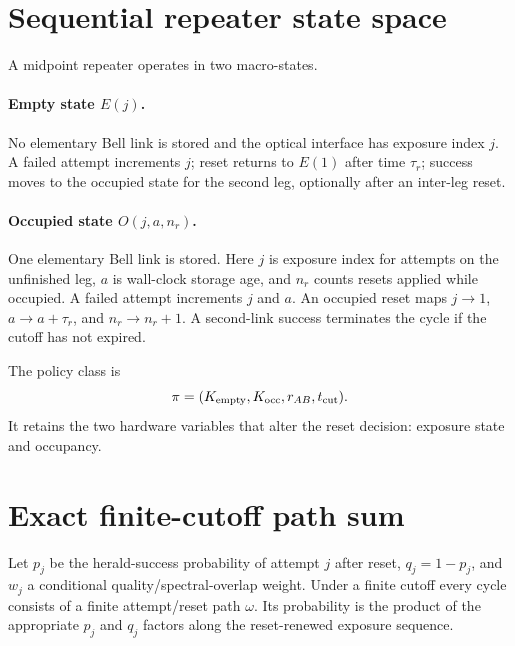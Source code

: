 \documentclass[aps,prx,preprint,superscriptaddress,nofootinbib,longbibliography]{revtex4-2}
\begin{document}
\section{Sequential repeater state space}
A midpoint repeater operates in two macro-states.

\paragraph{Empty state $E(j)$.}
No elementary Bell link is stored and the optical interface has exposure index $j$. A failed attempt increments $j$; reset returns to $E(1)$ after time $\tau_r$; success moves to the occupied state for the second leg, optionally after an inter-leg reset.

\paragraph{Occupied state $O(j,a,n_r)$.}
One elementary Bell link is stored. Here $j$ is exposure index for attempts on the unfinished leg, $a$ is wall-clock storage age, and $n_r$ counts resets applied while occupied. A failed attempt increments $j$ and $a$. An occupied reset maps $j\to1$, $a\to a+\tau_r$, and $n_r\to n_r+1$. A second-link success terminates the cycle if the cutoff has not expired.

The policy class is
\begin{equation}
 \pi=(K_{\rm empty},K_{\rm occ},r_{AB},t_{\rm cut}).
\end{equation}
It retains the two hardware variables that alter the reset decision: exposure state and occupancy.

\section{Exact finite-cutoff path sum}
Let $p_j$ be the herald-success probability of attempt $j$ after reset, $q_j=1-p_j$, and $w_j$ a conditional quality/spectral-overlap weight. Under a finite cutoff every cycle consists of a finite attempt/reset path $\omega$. Its probability is the product of the appropriate $p_j$ and $q_j$ factors along the reset-renewed exposure sequence.
\end{document}
